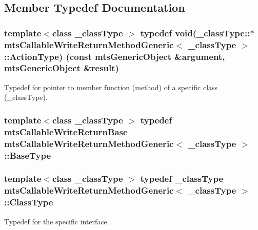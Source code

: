 \subsection{Member Typedef Documentation}
\hypertarget{classmts_callable_write_return_method_generic_ad1c87482f62321654e496a4e1929d93c}{}
\subsubsection[{Action\+Type}]{\setlength{\rightskip}{0pt plus 5cm}template$<$class \+\_\+class\+Type $>$ typedef void(\+\_\+class\+Type\+::$\ast$ {\bf mts\+Callable\+Write\+Return\+Method\+Generic}$<$ \+\_\+class\+Type $>$\+::Action\+Type) (const {\bf mts\+Generic\+Object} \&argument, {\bf mts\+Generic\+Object} \&result)}\label{classmts_callable_write_return_method_generic_ad1c87482f62321654e496a4e1929d93c}
Typedef for pointer to member function (method) of a specific class (\+\_\+class\+Type). \hypertarget{classmts_callable_write_return_method_generic_a45af3bcddc1608f32979dd6770b341ad}{}
\subsubsection[{Base\+Type}]{\setlength{\rightskip}{0pt plus 5cm}template$<$class \+\_\+class\+Type $>$ typedef {\bf mts\+Callable\+Write\+Return\+Base} {\bf mts\+Callable\+Write\+Return\+Method\+Generic}$<$ \+\_\+class\+Type $>$\+::{\bf Base\+Type}}\label{classmts_callable_write_return_method_generic_a45af3bcddc1608f32979dd6770b341ad}
\hypertarget{classmts_callable_write_return_method_generic_a32ecf59575aa52541be0693586a2319d}{}
\subsubsection[{Class\+Type}]{\setlength{\rightskip}{0pt plus 5cm}template$<$class \+\_\+class\+Type $>$ typedef \+\_\+class\+Type {\bf mts\+Callable\+Write\+Return\+Method\+Generic}$<$ \+\_\+class\+Type $>$\+::{\bf Class\+Type}}\label{classmts_callable_write_return_method_generic_a32ecf59575aa52541be0693586a2319d}
Typedef for the specific interface. \hypertarget{classmts_callable_write_return_method_generic_a628ed9547287aad4710fa55e37070f04}{}
